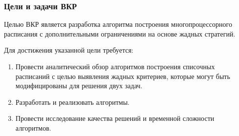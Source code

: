 \begin{frame}
    \frametitle{Цели и задачи ВКР}
    Целью ВКР является разработка алгоритма построения многопроцессорного расписания с дополнительными ограничениями на основе жадных стратегий.

    Для достижения указанной цели требуется:
    \begin{enumerate}
        \item Провести аналитический обзор алгоритмов построения списочных расписаний с целью выявления жадных критериев, которые могут быть модифицированы для решения двух задач.
        \item Разработать и реализовать алгоритмы.
        \item Провести исследование качества решений и временной сложности алгоритмов.
    \end{enumerate}
\end{frame}